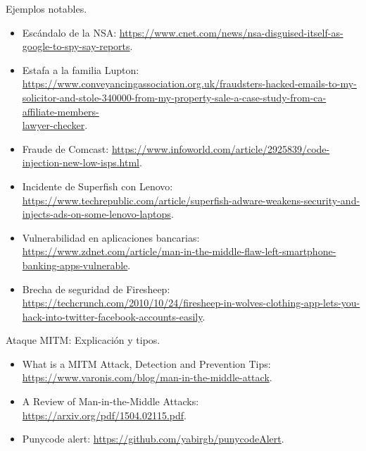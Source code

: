 \documentclass[11pt]{article}
\begin{document}
Ejemplos notables.
\begin{itemize}
	\item Escándalo de la NSA: \href{https://www.cnet.com/news/nsa-disguised-itself-as-google-to-spy-say-reports}{https://www.cnet.com/news/nsa-disguised-itself-as-google-to-spy-say-reports}.
	\item Estafa a la familia Lupton: \href{https://www.conveyancingassociation.org.uk/fraudsters-hacked-emails-to-my-solicitor-and-stole-340000-from-my-property-sale-a-case-study-from-ca-affiliate-members-lawyer-checker}{https://www.conveyancingassociation.org.uk/fraudsters-hacked-emails-to-my-solicitor-and-stole-340000-from-my-property-sale-a-case-study-from-ca-affiliate-members-\\lawyer-checker}.
	\item Fraude de Comcast: \href{https://www.infoworld.com/article/2925839/code-injection-new-low-isps.html}{https://www.infoworld.com/article/2925839/code-injection-new-low-isps.html}.
	\item Incidente de Superfish con Lenovo: \href{https://www.techrepublic.com/article/superfish-adware-weakens-security-and-injects-ads-on-some-lenovo-laptops}{https://www.techrepublic.com/article/superfish-adware-weakens-security-and-injects-ads-on-some-lenovo-laptops}.
	\item Vulnerabilidad en aplicaciones bancarias: \href{https://www.zdnet.com/article/man-in-the-middle-flaw-left-smartphone-banking-apps-vulnerable}{https://www.zdnet.com/article/man-in-the-middle-flaw-left-smartphone-banking-apps-vulnerable}.
	\item Brecha de seguridad de Firesheep: \href{https://techcrunch.com/2010/10/24/firesheep-in-wolves-clothing-app-lets-you-hack-into-twitter-facebook-accounts-easily}{https://techcrunch.com/2010/10/24/firesheep-in-wolves-clothing-app-lets-you-hack-into-twitter-facebook-accounts-easily}.
\end{itemize}

Ataque MITM: Explicación y tipos.
\begin{itemize}
	\item What is a MITM Attack, Detection and Prevention Tips: \href{https://www.varonis.com/blog/man-in-the-middle-attack}{https://www.varonis.com/blog/man-in-the-middle-attack}.
	\item A Review of Man-in-the-Middle Attacks: \href{https://arxiv.org/pdf/1504.02115.pdf}{https://arxiv.org/pdf/1504.02115.pdf}.
	\item Punycode alert: \href{https://github.com/yabirgb/punycodeAlert}{https://github.com/yabirgb/punycodeAlert}.
\end{itemize}
\end{document}
